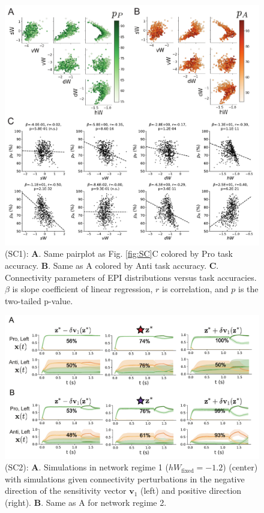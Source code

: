 \documentclass[11pt]{article}
\begin{document}
\begin{figure}
\begin{center}
\includegraphics[scale=0.9]{figures/figSC1/figSC1.pdf}
\end{center}
\caption{\small (SC1): \textbf{A}. Same pairplot as Fig. \ref{fig:SC}C colored by Pro task accuracy.  
\textbf{B}. Same as A colored by Anti task accuracy.  
\textbf{C}. Connectivity parameters of EPI distributions versus task accuracies.  $\beta$ is slope coefficient of linear regression, $r$ is correlation, and $p$ is the two-tailed p-value.
}
\label{fig:SC1}
\end{figure}

\begin{figure}
\begin{center}
\includegraphics[scale=0.7]{figures/figSC2/figSC2.pdf}
\end{center}
\caption{\small (SC2):  
\textbf{A}. Simulations in network regime 1 ($hW_{\text{fixed}} = -1.2$) (center) with simulations given connectivity perturbations in the negative direction of the sensitivity vector $\mathbf{v}_1$ (left) and positive direction (right).
\textbf{B}. Same as A for network regime 2.
}
\label{fig:SC2}
\end{figure}
\end{document}
